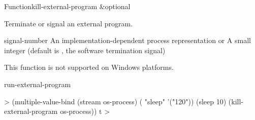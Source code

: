 \documentclass[10pt,twoside,english,pdftex]{article}
\begin{document}
\begin{functiondoc}{Function}{kill-external-program}{
  \&optional }
%
%
%
%

\fnsyntax

\fnpurpose Terminate or signal an external program.

\fnpackage {}

\fnmodule {}

\fnargs
\begin{args}{signal-number}
\arg[os-process] An implementation-dependent process representation or \nil{}
 A small integer (default is , the software
termination signal)
\end{args}
  
\fnerrors
This function is not supported on Windows platforms.

\begin{alsos}{run-external-program}
\end{alsos}

%
\fnexample
%
\W\supp
\begin{example}
  > (multiple-value-bind (stream os-process)
         ( "sleep" '("120"))
       (sleep 10)
       (kill-external-program os-process))
  t
  >
\end{example}

\end{functiondoc}

\end{document}
